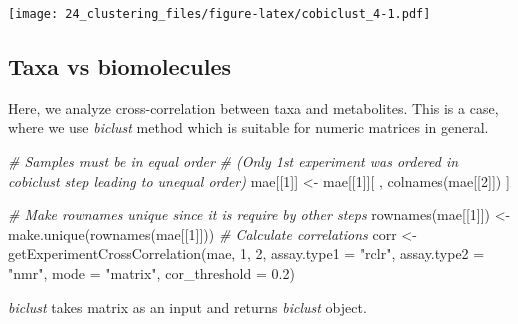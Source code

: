 \documentclass[
]{book}
\newenvironment{Shaded}{\begin{snugshade}}{\end{snugshade}}
\newcommand{\AttributeTok}[1]{\textcolor[rgb]{0.77,0.63,0.00}{#1}}
\newcommand{\CommentTok}[1]{\textcolor[rgb]{0.56,0.35,0.01}{\textit{#1}}}
\newcommand{\DecValTok}[1]{\textcolor[rgb]{0.00,0.00,0.81}{#1}}
\newcommand{\FloatTok}[1]{\textcolor[rgb]{0.00,0.00,0.81}{#1}}
\newcommand{\FunctionTok}[1]{\textcolor[rgb]{0.00,0.00,0.00}{#1}}
\newcommand{\NormalTok}[1]{#1}
\newcommand{\OtherTok}[1]{\textcolor[rgb]{0.56,0.35,0.01}{#1}}
\newcommand{\StringTok}[1]{\textcolor[rgb]{0.31,0.60,0.02}{#1}}
\begin{document}
\texttt{[image: 24\_clustering\_files/figure-latex/cobiclust\_4-1.pdf]}

\hypertarget{taxa-vs-biomolecules}{%
\subsection{Taxa vs biomolecules}\label{taxa-vs-biomolecules}}

Here, we analyze cross-correlation between taxa and metabolites. This
is a case, where we use \emph{biclust} method which is suitable for numeric
matrices in general.

\begin{Shaded}
\begin{Highlighting}[]
\CommentTok{\# Samples must be in equal order }
\CommentTok{\# (Only 1st experiment  was ordered in cobiclust step leading to unequal order)}
\NormalTok{mae[[}\DecValTok{1}\NormalTok{]] }\OtherTok{\textless{}{-}}\NormalTok{ mae[[}\DecValTok{1}\NormalTok{]][ , }\FunctionTok{colnames}\NormalTok{(mae[[}\DecValTok{2}\NormalTok{]]) ]}

\CommentTok{\# Make rownames unique since it is require by other steps}
\FunctionTok{rownames}\NormalTok{(mae[[}\DecValTok{1}\NormalTok{]]) }\OtherTok{\textless{}{-}} \FunctionTok{make.unique}\NormalTok{(}\FunctionTok{rownames}\NormalTok{(mae[[}\DecValTok{1}\NormalTok{]]))}
\CommentTok{\# Calculate correlations}
\NormalTok{corr }\OtherTok{\textless{}{-}} \FunctionTok{getExperimentCrossCorrelation}\NormalTok{(mae, }\DecValTok{1}\NormalTok{, }\DecValTok{2}\NormalTok{, }
                                      \AttributeTok{assay.type1 =} \StringTok{"rclr"}\NormalTok{, }
                                      \AttributeTok{assay.type2 =} \StringTok{"nmr"}\NormalTok{, }
                                      \AttributeTok{mode =} \StringTok{"matrix"}\NormalTok{, }
                                      \AttributeTok{cor\_threshold =} \FloatTok{0.2}\NormalTok{)}
\end{Highlighting}
\end{Shaded}

\emph{biclust} takes matrix as an input and returns \emph{biclust} object.
\end{document}
